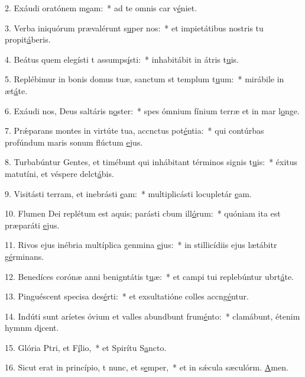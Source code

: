 2. Exáudi oratónem m\uline{e}am:~* ad te omnis car v\uline{é}niet.\par 
3. Verba iniquórum prævalérunt s\uline{u}per nos:~* et impietátibus nostris tu propit\uline{á}beris.\par 
4. Beátus quem elegísti t assumps\uline{í}sti:~* inhabitábit in átris t\uline{u}is.\par 
5. Replébimur in bonis domus tuæ, sanctum st templum t\uline{u}um:~* mirábile in æt\uline{á}te.\par 
6. Exáudi nos, Deus saltáris n\uline{o}ster:~* spes ómnium fínium terræ et in mar l\uline{o}nge.\par 
7. Prǽparans montes in virtúte tua, accnctus pot\uline{é}ntia:~* qui contúrbas profúndum maris sonum flúctum \uline{e}jus.\par 
8. Turbabúntur Gentes, et timébunt qui inhábitant términos  signis t\uline{u}is:~* éxitus matutíni, et véspere delct\uline{á}bis.\par 
9. Visitásti terram, et inebrásti \uline{e}am:~* multiplicásti locupletár \uline{e}am.\par 
10. Flumen Dei replétum est aquis; parásti cbum ill\uline{ó}rum:~* quóniam ita est præparáti \uline{e}jus.\par 
11. Rivos ejus inébria multíplica genmina \uline{e}jus:~* in stillicídiis ejus lætábitr g\uline{é}rminans.\par 
12. Benedíces corónæ anni benigntátis t\uline{u}æ:~* et campi tui replebúntur ubrt\uline{á}te.\par 
13. Pinguéscent specisa des\uline{é}rti:~* et exsultatióne colles accng\uline{é}ntur.\par 
14. Indúti sunt aríetes óvium et valles abundbunt frum\uline{é}nto:~* clamábunt, étenim hymnm d\uline{i}cent.\par 
15. Glória Ptri, et F\uline{í}lio,~* et Spirítu S\uline{a}ncto.\par 
16. Sicut erat in princípio, t nunc, et s\uline{e}mper,~* et in sǽcula sæculórm. \uline{A}men.\par 
